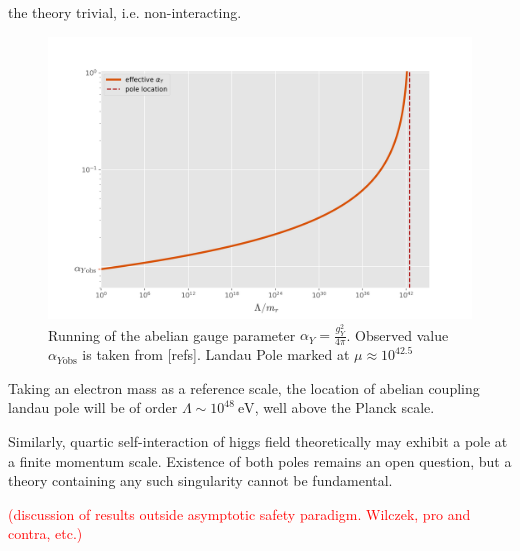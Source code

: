 \documentclass[11pt, a4paper]{article}
\begin{document}
the theory trivial, i.e. non-interacting.
\begin{figure}[H]
    \includegraphics[width=1\textwidth]{./figures/plotr.jpg}
    \caption{Running of the abelian gauge parameter $\alpha_Y = \frac{g_Y^2}{4\pi}$. Observed value $\alpha_{Y\text{obs}}$ is taken from [refs]. 
    Landau Pole marked at $\mu \approx 10^{42.5}$}
    \label{boxes}
\end{figure} 
Taking an electron mass as a reference scale, the location of abelian coupling landau pole will be of order $\Lambda \sim 10^{48} \ \text{eV}$, well above the Planck scale.

Similarly, quartic self-interaction of higgs field theoretically may exhibit a pole at a finite momentum scale.
Existence of both poles remains an open question, but a theory containing any such singularity cannot be fundamental.

\textcolor{red}{(discussion of results outside asymptotic safety paradigm. Wilczek, pro and contra, etc.)} 

\end{document}
